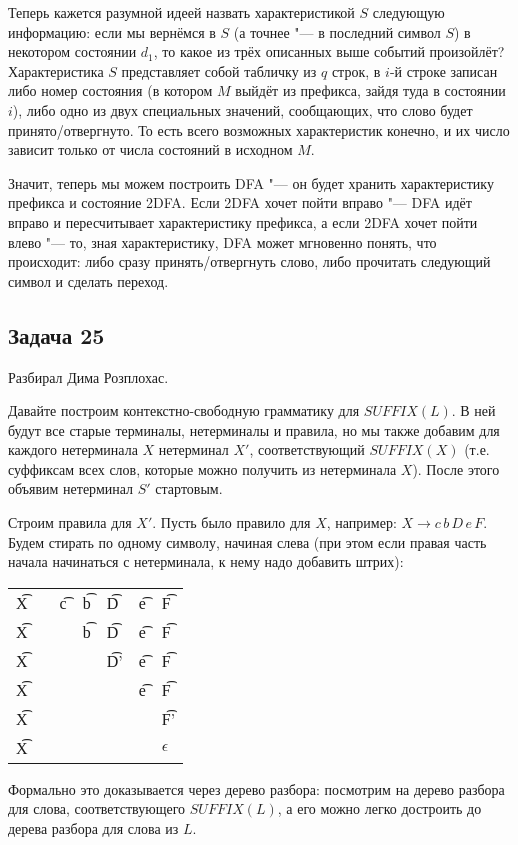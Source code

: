 	Теперь кажется разумной идеей назвать характеристикой $S$ следующую информацию:
	если мы вернёмся в $S$ (а точнее "--- в последний символ $S$) в некотором состоянии $d_1$,
	то какое из трёх описанных выше событий произойлёт?
	Характеристика $S$ представляет собой табличку из $q$ строк, в $i$-й строке записан либо
	номер состояния (в котором $M$ выйдёт из префикса, зайдя туда в состоянии $i$), либо
	одно из двух специальных значений, сообщающих, что слово будет принято/отвергнуто.
	То есть всего возможных характеристик конечно, и их число зависит только от числа состояний в
	исходном $M$.

	Значит, теперь мы можем построить DFA "--- он будет хранить характеристику префикса и состояние 2DFA.
	Если 2DFA хочет пойти вправо "--- DFA идёт вправо и пересчитывает характеристику префикса,
	а если 2DFA хочет пойти влево "--- то, зная характеристику, DFA может мгновенно понять, что происходит:
	либо сразу принять/отвергнуть слово, либо прочитать следующий символ и сделать переход.

\subsection{Задача 25}
	Разбирал Дима Розплохас.

	Давайте построим контекстно-свободную грамматику для $SUFFIX(L)$.
	В ней будут все старые терминалы, нетерминалы и правила, но мы также
	добавим для каждого нетерминала $X$ нетерминал $X'$, соответствующий $SUFFIX(X)$
	(т.е. суффиксам всех слов, которые можно получить из нетерминала $X$).
	После этого объявим нетерминал $S'$ стартовым.

	Строим правила для $X'$.
	Пусть было правило для $X$, например: $X \to c\,b\,D\,e\,F$.
	Будем стирать по одному символу, начиная слева (при этом если правая часть начала начинаться с нетерминала,
	к нему надо добавить штрих):
	\begin{center}
		\begin{tabular}{rclllll}
			\t{X} &\to& \t{c}&\t{b}&\t{D}&\t{e}&\t{F} \\
			\t{X} &\to&      &\t{b}&\t{D}&\t{e}&\t{F} \\
			\t{X} &\to&      &     &\t{D'}&\t{e}&\t{F} \\
			\t{X} &\to&      &     &      &\t{e}&\t{F} \\
			\t{X} &\to&      &     &      &     &\t{F'} \\
			\t{X} &\to&      &     &      &     &$\epsilon$ \\
		\end{tabular}
	\end{center}
	Формально это доказывается через дерево разбора: посмотрим на дерево разбора для слова,
	соответствующего $SUFFIX(L)$, а его можно легко достроить до дерева разбора для слова из $L$.

